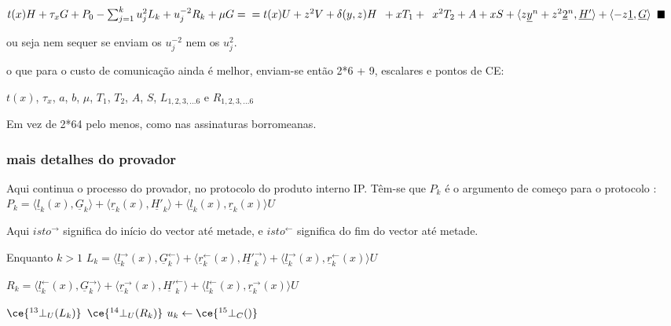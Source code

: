 $t(x) H + \bold{\tau}_x G + P_0 - \sum_{j=1}^{k} u_{j}^{2}L_k + u_{j}^{-2}R_k + \mu G=\\= t(x) U + z^2 V + \delta(y, z) H \enspace+ x T_1 +\enspace x^2 T_2 + A + x S + \langle z\underline{y}^n + z^2\underline{2}^n,\underline{H'}\rangle + \langle -z\underline{1},\underline{G}\rangle$
$\hspace*{\fill} \blacksquare$

ou seja nem sequer se enviam os $u_{j}^{-2}$ nem os $u_{j}^{2}$.

o que para o custo de comunicação ainda é melhor, enviam-se então 2*6 + 9, escalares e pontos de CE:

$t(x)$, $\tau_x$, $a$, $b$, $\mu$, $T_1$, $T_2$, $A$, $S$, $L_{1,2,3,...6}$ e $R_{1,2,3,...6}$ 


Em vez de 2*64 pelo menos, como nas assinaturas borromeanas. 
\newpage
\subsubsection{mais detalhes do provador}
\label{sec:bullet_detalhes}

Aqui continua o processo do provador, no protocolo do produto interno IP. Têm-se que $P_k$ é o argumento de começo para o protocolo :\newline
$P_k = \langle \underline{l}_k(x),\underline{G}_k\rangle + \langle \underline{r}_k(x),\underline{H'}_k\rangle + \langle \underline{l}_k(x), \underline{r}_k(x)\rangle U$

Aqui $isto^{\rightarrow}$ significa do início do vector até metade, e $isto^{\leftarrow}$ significa do fim do vector até metade.

Enquanto $k>1$\newline
$L_k = \langle \underline{l}^{\rightarrow}_{k}(x),\underline{G}^{\leftarrow}_{k}\rangle + \langle \underline{r}^{\leftarrow}_{k}(x),\underline{H'}^{\rightarrow}_{k}\rangle + \langle \underline{l}^{\rightarrow}_{k}(x), \underline{r}^{\leftarrow}_{k}(x)\rangle U$

$R_k = \langle \underline{l}^{\leftarrow}_{k}(x),\underline{G}^{\rightarrow}_{k}\rangle + \langle \underline{r}^{\rightarrow}_{k}(x),\underline{H'}^{\leftarrow}_{k}\rangle + \langle \underline{l}^{\leftarrow}_{k}(x), \underline{r}^{\rightarrow}_{k}(x)\rangle U$

\hspace*{\fill} $\ce{^{13}_{\ }\bot_U(L_k)}$ \newline
\hspace*{\fill} $\ce{^{14}_{\ }\bot_U(R_k)}$ \newline
$u_{k}\leftarrow \ce{^{15}_{\ }\bot_C()}$\newline

